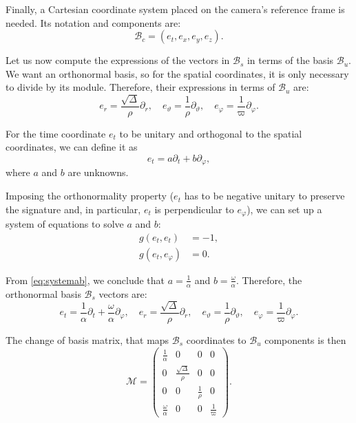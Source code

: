 Finally, a Cartesian coordinate system placed on the camera's reference frame is needed. Its notation and components are:
\[
\mathcal{B}_c = (e_t, e_x, e_y, e_z).
\]

Let us now compute the expressions of the vectors in $\mathcal{B}_s$ in terms of the basis $\mathcal{B}_u$. We want an orthonormal basis, so for the spatial coordinates, it is only necessary to divide by its module. Therefore, their expressions in terms of $\mathcal{B}_u$ are:
\begin{equation}
e_r = \frac{\sqrt{\Delta}}{\rho} \partial_r, \quad
e_\vartheta = \frac{1}{\rho} \partial_\vartheta, \quad
e_\varphi = \frac{1}{\varpi} \partial_\varphi.
\end{equation}

For the time coordinate $e_t$ to be unitary and orthogonal to the spatial coordinates, we can define it as
\[
e_t = a\partial_t + b\partial_\varphi,
\]
where $a$ and $b$ are unknowns.

Imposing the orthonormality property ($e_t$ has to be negative unitary to preserve the signature and, in particular, $e_t$ is perpendicular to $e_\varphi$), we can set up a system of equations to solve $a$ and $b$:
\begin{align}
\label{eq:systemab}
g(e_t, e_t) &= -1, \\ \nonumber
g(e_t, e_\varphi) &= 0.
\end{align}

From \autoref{eq:systemab}, we conclude that $a = \frac{1}{\alpha}$ and $b = \frac{\omega}{\alpha}$. Therefore, the orthonormal basis $\mathcal{B}_s$ vectors are:
\begin{equation}
e_t = \frac{1}{\alpha}\partial_t + \frac{\omega}{\alpha}\partial_\varphi, \quad
e_r = \frac{\sqrt{\Delta}}{\rho} \partial_r, \quad
e_\vartheta = \frac{1}{\rho} \partial_\vartheta, \quad
e_\varphi = \frac{1}{\varpi} \partial_\varphi.
\end{equation}

The change of basis matrix, that maps $\mathcal{B}_s$ coordinates to $\mathcal{B}_u$ components is then
\begin{equation}
\mathcal{M} = \begin{pmatrix}
\frac{1}{\alpha} & 0 & 0 & 0 \\
0 & \frac{\sqrt{\Delta}}{\rho} & 0 & 0 \\
0 & 0 & \frac{1}{\rho} & 0 \\
\frac{\omega}{\alpha} & 0 & 0 & \frac{1}{\varpi}
\end{pmatrix}.
\end{equation}

